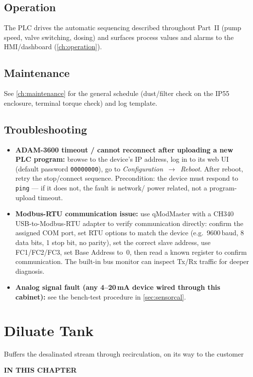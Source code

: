 \documentclass[a4paper,11pt,twoside,openright,numbers=noenddot]{scrreprt}
\newcommand{\chaptersubtitle}[1]{%
  \vspace{-12pt}\par
  {\sffamily\fontsize{13}{17}\selectfont\color{hvmuted}\raggedright #1\par}
  \vspace{10pt}}
\newcommand{\chaptertoc}{%
  \begingroup
  \etocsetnexttocdepth{1}%
  \etocsettocstyle
    {{\sffamily\bfseries\footnotesize\color{hvmuted}IN THIS CHAPTER\par}%
     \vspace{5pt}{\color{hvink}\rule{\linewidth}{1.2pt}}\par\vspace{2pt}}{}%
  \etocsetstyle{section}{}{}
    {\par\vspace{4pt}\noindent
     \makebox[11mm][l]{\sffamily\bfseries\small\color{hvprimary}\etocnumber}%
     \sffamily\small\etocname\hfill{\color{hvmuted}\etocpage}%
     \par\vspace{4pt}{\color{hvrule}\rule{\linewidth}{0.4pt}}}{}%
  \localtableofcontents
  \endgroup}
\begin{document}
\section{Operation}
The PLC drives the automatic sequencing described throughout Part~II
(pump speed, valve switching, dosing) and surfaces process values and
alarms to the HMI/dashboard (\cref{ch:operation}).

\section{Maintenance}
See \cref{ch:maintenance} for the general schedule (dust/filter check on
the IP55 enclosure, terminal torque check) and log template.

\section{Troubleshooting}
\begin{itemize}
\item \textbf{ADAM-3600 timeout / cannot reconnect after uploading a new
  PLC program:} browse to the device's IP address, log in to its web UI
  (default password \texttt{00000000}), go to \emph{Configuration~$\to$~Reboot}.
  After reboot, retry the stop/connect sequence. Precondition: the device
  must respond to \texttt{ping} --- if it does not, the fault is network/
  power related, not a program-upload timeout.
\item \textbf{Modbus-RTU communication issue:} use qModMaster with a CH340
  USB-to-Modbus-RTU adapter to verify communication directly: confirm the
  assigned COM port, set RTU options to match the device (e.g.\
  9600\,baud, 8 data bits, 1 stop bit, no parity), set the correct slave
  address, use FC1/FC2/FC3, set Base Address to~0, then read a known
  register to confirm communication. The built-in bus monitor can inspect
  Tx/Rx traffic for deeper diagnosis.
\item \textbf{Analog signal fault (any 4--20\,mA device wired through this
  cabinet):} see the bench-test procedure in \cref{sec:sensorcal}.
\end{itemize}


\chapter{Diluate Tank}
\label{ch:tankdiluate}
\chaptersubtitle{Buffers the desalinated stream through recirculation, on its way to the customer}
\chaptertoc
\end{document}
